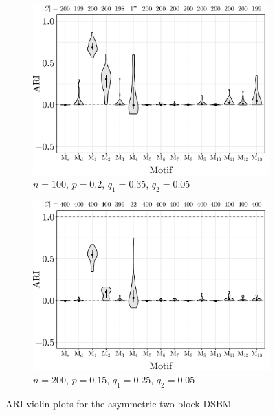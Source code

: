 \begin{figure}[H]
	\begin{subfigure}{.49\textwidth}
		\centering
		\includegraphics[scale=0.4,draft=false]{../../results/motifassym/motifassym_1.pdf}
		\caption{$n=100$, $p=0.2$, $q_1=0.35$, $q_2=0.05$}
	\end{subfigure}
	\begin{subfigure}{.49\textwidth}
		\centering
		\includegraphics[scale=0.4,draft=false]{../../results/motifassym/motifassym_2.pdf}
		\caption{$n=200$, $p=0.15$, $q_1=0.25$, $q_2=0.05$}
	\end{subfigure}
	\caption{ARI violin plots for the asymmetric two-block DSBM}
	\label{fig:motifassym}
\end{figure}












